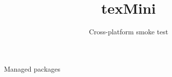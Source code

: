 \documentclass{beamer}
\title{texMini}
\author{Cross-platform smoke test}
\begin{document}
\begin{frame}
  \titlepage
\end{frame}
\begin{frame}{Managed packages}
\end{frame}
\end{document}
